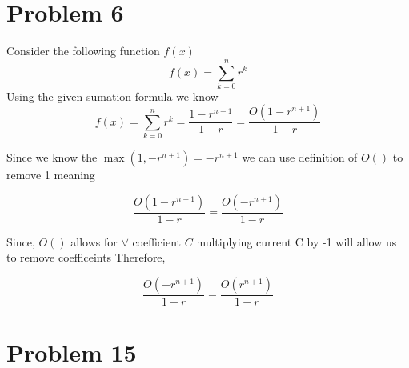 \documentclass[]{article}
\begin{document}
\section*{Problem 6}

Consider the following function $f(x)$
\[f(x) = \sum_{k=0}^{n}r^k\]
Using the given sumation formula we know
\[f(x) = \sum_{k=0}^{n}r^k = \frac{1-r^{n+1}}{1-r}=\frac{O(1-r^{n+1})}{1-r}\]

Since we know the $\max(1, -r^{n+1}) = -r^{n+1}$ we can use definition of $O()$ to remove 1 meaning

\[\frac{O(1-r^{n+1})}{1-r} = \frac{O(-r^{n+1})}{1-r}\]

Since, $O()$ allows for $\forall $ coefficient $C$ multiplying current C by -1 will allow us to remove coefficeints Therefore,

\[\frac{O(-r^{n+1})}{1-r} = \frac{O(r^{n+1})}{1-r}\]

\section*{Problem 15}
\end{document}
